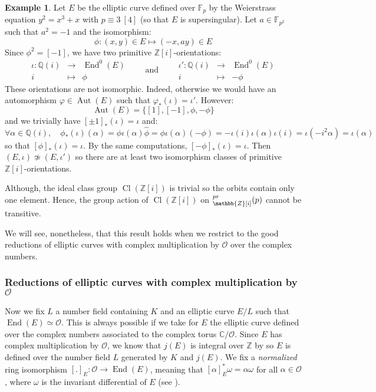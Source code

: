 \documentclass[a4paper,10pt]{report}
\theoremstyle{definition}
\theoremstyle{plain}
\theoremstyle{definition}
\newtheorem{example}[definition]{Example}
\newcommand{\Z}{\mathbb{Z}}
\newcommand{\Q}{\mathbb{Q}}
\newcommand{\C}{\mathbb{C}}
\newcommand{\F}{\mathbb{F}}
\newcommand{\mO}{\mathcal{O}}
\renewcommand{\(}{\left(}
\renewcommand{\)}{\right)}
\DeclareMathOperator{\End}{End}
\DeclareMathOperator{\Aut}{Aut}
\DeclareMathOperator{\Cl}{Cl}
\let\SS\relax
\DeclareMathOperator{\SS}{SS}
\begin{document}
\begin{example}\label{example 1}
Let $E$ be the elliptic curve defined over $\F_p$ by the Weierstrass equation $y^2=x^3+x$ with $p\equiv 3 \ [4]$ (so that $E$ is supersingular).  Let $a\in\F_{p^2}$ such that $a^2=-1$ and the isomorphism:
\[\phi : (x,y)\in E \longmapsto (-x,ay)\in E\]
Since $\phi^2=[-1]$,  we have two primitive $\Z[i]$-orientations:
\[\begin{array}{rcl}
\iota : \Q(i) & \longrightarrow & \End^0(E)\\
i & \longmapsto & \phi
\end{array} 
\qquad \mbox{and} \qquad
 \begin{array}{rcl}
\iota' : \Q(i) & \longrightarrow & \End^0(E)\\
i & \longmapsto & -\phi
\end{array}\]
These orientations are not isomorphic.  Indeed,  otherwise we would have an automorphism $\varphi\in\Aut(E)$ such that $\varphi_*(\iota)=\iota'$.  However:
\[\Aut(E)=\{[1],[-1],\phi,-\phi\}\]
and we trivially have $[\pm 1]_*(\iota)=\iota$ and:
\[\forall \alpha\in \Q(i), \quad \phi_*(\iota)(\alpha)=\phi\iota(\alpha)\widehat{\phi}=\phi\iota(\alpha)(-\phi)=-\iota(i)\iota(\alpha)\iota(i)=\iota(-i^2\alpha)=\iota(\alpha)\]
so that $[\phi]_*(\iota)=\iota$.  By the same computations,  $[-\phi]_*(\iota)=\iota$.  Then $(E,\iota)\not\simeq (E,\iota')$ so there are at least two isomorphism classes of primitive $\Z[i]$-orientations.  

Although,  the ideal class group $\Cl(\Z[i])$ is trivial so the orbits contain only one element.  Hence,  the group action of $\Cl(\Z[i])$ on $\SS_{\Z[i]}^{pr}(p)$ cannot be transitive.
\end{example}

We will see,  nonetheless,  that this result holds when we restrict to the good reductions of elliptic curves with complex multiplication by $\mO$ over the complex numbers. 

\subsubsection{Reductions of elliptic curves with complex multiplication by $\mO$}

Now we fix $L$ a number field containing $K$ and an elliptic curve $E/L$ such that $\End(E)\simeq \mO$. This is always possible if we take for $E$ the elliptic curve defined over the complex numbers associated to the complex torus $\C/\mO$.  Since $E$ has complex multiplication by $\mO$,  we know that $j(E)$ is integral over $\Z$ by \cite[theorem II.6.1]{Silverman2} so $E$ is defined over the number field $L$ generated by $K$ and $j(E)$.  We fix a \emph{normalized} ring isomorphism $[.]_E:\mO\longrightarrow \End(E)$,  meaning that $[\alpha]_E^*\omega=\alpha\omega$ for all $\alpha\in\mO$,  where $\omega$ is the invariant differential of $E$ (see \cite[proposition II.1.1]{Silverman2}). 
\end{document}
